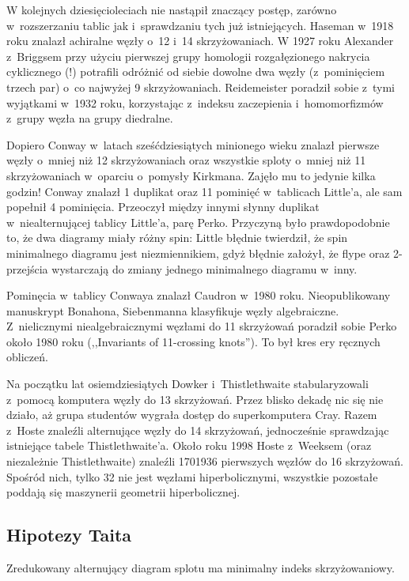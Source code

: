{W kolejnych dziesięcioleciach nie nastąpił znaczący postęp, zarówno w~rozszerzaniu tablic jak i~sprawdzaniu tych już istniejących.
Haseman w~1918 roku znalazł achiralne węzły o~12 i~14 skrzyżowaniach.
W 1927 roku Alexander z~Briggsem przy użyciu pierwszej grupy homologii rozgałęzionego nakrycia cyklicznego (!) potrafili odróżnić od siebie dowolne dwa węzły (z~pominięciem trzech par) o~co najwyżej 9 skrzyżowaniach.
Reidemeister poradził sobie z~tymi wyjątkami w~1932 roku, korzystając z~indeksu zaczepienia i~homomorfizmów z~grupy węzła na grupy diedralne.


Dopiero Conway w~latach sześćdziesiątych minionego wieku znalazł pierwsze węzły o~mniej niż 12 skrzyżowaniach oraz wszystkie sploty o~mniej niż 11 skrzyżowaniach w~oparciu o~pomysły Kirkmana.
Zajęło mu to jedynie kilka godzin!
Conway znalazł 1 duplikat oraz 11 pominięć w~tablicach Little'a, ale sam popełnił 4 pominięcia.
Przeoczył między innymi słynny duplikat w~niealternującej tablicy Little'a, parę Perko.
Przyczyną było prawdopodobnie to, że dwa diagramy miały różny spin:
Little błędnie twierdził, że spin minimalnego diagramu jest niezmiennikiem, gdyż błędnie założył, że flype oraz 2-przejścia wystarczają do zmiany jednego minimalnego diagramu w~inny.

Pominęcia w~tablicy Conwaya znalazł Caudron w~1980 roku.
Nieopublikowany manuskrypt Bonahona, Siebenmanna klasyfikuje węzły algebraiczne.
Z~nielicznymi niealgebraicznymi węzłami do 11 skrzyżowań poradził sobie Perko około 1980 roku (,,Invariants of 11-crossing knots'').
To był kres ery ręcznych obliczeń.

Na początku lat osiemdziesiątych Dowker i~Thistlethwaite stabularyzowali z~pomocą komputera węzły do 13 skrzyżowań.
Przez blisko dekadę nic się nie działo, aż grupa studentów wygrała dostęp do superkomputera Cray.
Razem z~Hoste znaleźli alternujące węzły do 14 skrzyżowań, jednocześnie sprawdzając istniejące tabele Thistlethwaite'a.
Około roku 1998 Hoste z~Weeksem (oraz niezależnie Thistlethwaite) znaleźli 1701936 pierwszych węzłów do 16 skrzyżowań.
Spośród nich, tylko 32 nie jest węzłami hiperbolicznymi, wszystkie pozostałe poddają się maszynerii geometrii hiperbolicznej.

\subsection{Hipotezy Taita}
\begin{conjecture}
    \label{conj_tait_i}
    Zredukowany alternujący diagram splotu ma minimalny indeks skrzyżowaniowy.
\end{conjecture}

}
